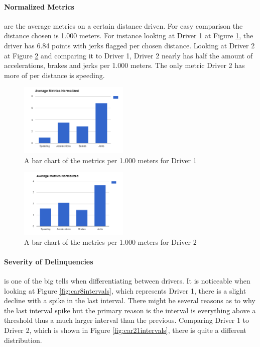 \paragraph{Normalized Metrics} are the average metrics on a certain distance driven. For easy comparison the distance chosen is 1.000 meters. For instance looking at Driver 1 at Figure \ref{fig:car8amn}, the driver has 6.84 points with jerks flagged per chosen distance. Looking at Driver 2 at Figure \ref{fig:car21amn} and comparing it to Driver 1, Driver 2 nearly has half the amount of accelerations, brakes and jerks per 1.000 meters. The only metric Driver 2 has more of per distance is speeding.

\begin{figure}[tb]
\centering
\includegraphics[width=0.465\textwidth]{Pictures/car8amn}
\caption{A bar chart of the metrics per 1.000 meters for Driver 1}
\label{fig:car8amn}
\end{figure}

\begin{figure}[tb]
\centering
\includegraphics[width=0.465\textwidth]{Pictures/car21amn}
\caption{A bar chart of the metrics per 1.000 meters for Driver 2}
\label{fig:car21amn}
\end{figure}

\paragraph{Severity of Delinquencies} is one of the big tells when differentiating between drivers. It is noticeable when looking at Figure \ref{fig:car8intervals}, which represents Driver 1, there is a slight decline with a spike in the last interval. There might be several reasons as to why the last interval spike but the primary reason is the interval is everything above a threshold thus a much larger interval than the previous. Comparing Driver 1 to Driver 2, which is shown in Figure \ref{fig:car21intervals}, there is quite a different distribution.

